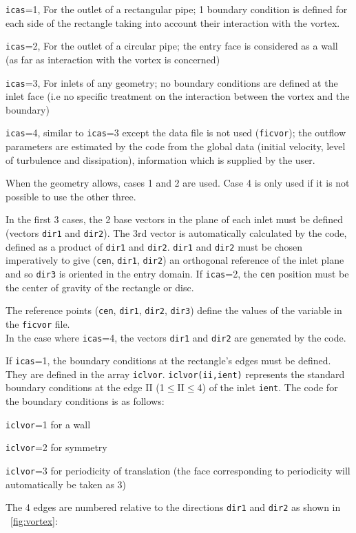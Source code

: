 {{{\begin{list}{-}{}
\begin{list}{*}{}
\item \texttt{icas}=1, For the outlet of a rectangular pipe; 1 boundary condition is defined
for each side of the rectangle taking into account their interaction
with the vortex.
\item \texttt{icas}=2, For the outlet of a circular pipe; the entry face is considered as a
 wall (as far as interaction with the vortex is concerned)
\item \texttt{icas}=3, For inlets of any geometry; no boundary conditions are defined at the
 inlet face (i.e no specific treatment on the interaction between the
 vortex and the boundary)
\item \texttt{icas}=4, similar to \texttt{icas}=3 except the data file is not
 used (\texttt{ficvor}); the outflow
 parameters are estimated by the code from the global data (initial
 velocity, level of turbulence and dissipation), information which is
 supplied by the user.
\end{list}

When the geometry allows, cases 1 and 2 are used. Case 4 is only used
 if it is not possible to use the other three.

In the first 3 cases, the 2 base vectors in the plane of each inlet
must be defined (vectors \texttt{dir1} and \texttt{dir2}). The 3rd vector is
automatically calculated by the code, defined as a product of \texttt{dir1} and
\texttt{dir2}. \texttt{dir1} and \texttt{dir2} must be chosen imperatively to
give (\texttt{cen}, \texttt{dir1}, \texttt{dir2}) an orthogonal reference of the
inlet plane and so \texttt{dir3} is oriented in the entry domain. If
\texttt{icas}=2, the \texttt{cen} position must be the center of gravity of the
rectangle or disc.

The reference points (\texttt{cen}, \texttt{dir1}, \texttt{dir2}, \texttt{dir3})
 define the values of the variable in the \texttt{ficvor} file.\\
In the case where \texttt{icas}=4, the vectors \texttt{dir1} and \texttt{dir2}
are generated by the code.

If \texttt{icas}=1, the boundary conditions at the rectangle's edges must be
defined. They are defined in the array
\texttt{iclvor}. \texttt{iclvor(ii,ient)} represents the standard boundary
conditions at the edge II (1$\leqslant$II$\leqslant$4) of the inlet
\texttt{ient}. The code for the boundary conditions is as follows:
\begin{list}{*}{}
\item \texttt{iclvor}=1 for a wall
\item \texttt{iclvor}=2 for symmetry
\item \texttt{iclvor}=3 for periodicity of translation (the face corresponding
      to periodicity will automatically be taken as 3)
\end{list}
The 4 edges are numbered relative to the directions \texttt{dir1} and
\texttt{dir2} as shown in \figurename~\ref{fig:vortex}:


\end{list}}}}
